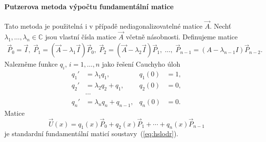 \paragraph{Putzerova metoda výpočtu fundamentální matice}
Tato metoda je použitelná i v případě nediagonalizovatelné matice $\vec{A}$.
Nechť $\lambda_1,\ldots,\lambda_n\in\mathbb{C}$ jsou vlastní čísla matice $\vec{A}$ včetně násobnosti.
Definujeme matice
\[
   \begin{split}
   \vec{P}_0 = \vec{I},\;
   \vec{P}_1 = (\vec{A}-\lambda_1\vec{I})\vec{P}_0,\;
   \vec{P}_2 = (\vec{A}-\lambda_2\vec{I})\vec{P}_1,\;
   \ldots,\;
   \vec{P}_{n-1} = (A-\lambda_{n-1}I)\vec{P}_{n-2}.
   \end{split}
\]
Nalezněme funkce $q_i$, $i=1,\ldots,n$ jako řešení Cauchyho úloh
\begin{align*}
      q_1' &= \lambda_1q_1,  & q_1(0) &= 1,\\
      q_2' &= \lambda_2q_2+q_1,  & q_2(0) &= 0,\\
      &\cdots\\
      q_n' &= \lambda_nq_n+q_{n-1},  & q_n(0) &= 0.
\end{align*}
Matice
\[
  \vec{U}(x) = q_1(x)\vec{P}_0 + q_2(x)\vec{P}_1 + \cdots + q_n(x)\vec{P}_{n-1}
\]
je standardní fundamentální maticí soustavy~(\ref{eq:hslodr}).

